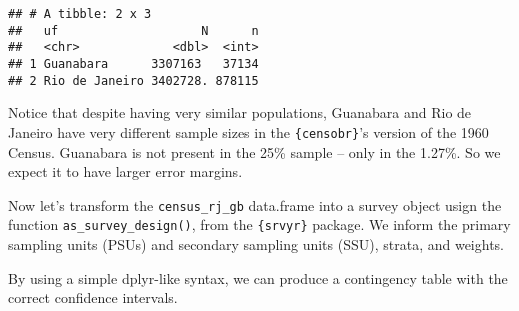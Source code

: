 \documentclass[
]{article}
\begin{document}
\begin{verbatim}
## # A tibble: 2 x 3
##   uf                    N      n
##   <chr>             <dbl>  <int>
## 1 Guanabara      3307163   37134
## 2 Rio de Janeiro 3402728. 878115
\end{verbatim}

Notice that despite having very similar populations, Guanabara and Rio
de Janeiro have very different sample sizes in the
\texttt{\{censobr\}}'s version of the 1960 Census. Guanabara is not
present in the 25\% sample -- only in the 1.27\%. So we expect it to
have larger error margins.

Now let's transform the \texttt{census\_rj\_gb} data.frame into a survey
object usign the function \texttt{as\_survey\_design()}, from the
\texttt{\{srvyr\}} package. We inform the primary sampling units (PSUs)
and secondary sampling units (SSU), strata, and weights.

By using a simple dplyr-like syntax, we can produce a contingency table
with the correct confidence intervals.
\end{document}
